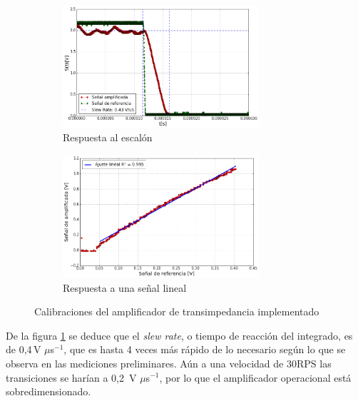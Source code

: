 \begin{figure}[H]
    \begin{subfigure}[b]{0.5\textwidth}
        \centering
        \includegraphics[width=0.8\textwidth]{fig/circuito/amp/transicion_cuadrada}
        \caption{Respuesta al escalón}
        \label{fig:circuito/amp/transicion_escalon}
    \end{subfigure}
    \begin{subfigure}[b]{0.5\textwidth}
        \centering
        \includegraphics[width=0.8\textwidth]{fig/circuito/amp/rango_lineal}
        \caption{Respuesta a una señal lineal}
        \label{fig:circuito/amp/rango_lineal}
    \end{subfigure}
    \caption{Calibraciones del amplificador de transimpedancia implementado}
\end{figure}

De la figura \ref{fig:circuito/amp/transicion_escalon} se deduce que el \emph{slew rate}, o tiempo de reacción del integrado, es de 0,4$\,$V $\mu$s$^{-1}$, que es hasta 4 veces más rápido de lo necesario según lo que se observa en las mediciones preliminares. Aún a una velocidad de 30RPS las transiciones se harían a 0,2 $\,$V $\mu$s$^{-1}$, por lo que el amplificador operacional está sobredimensionado.

